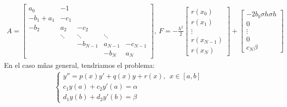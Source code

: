 \begin{align*}
    A = \begin{bmatrix}
            a_0       & -1     &          &         &          \\
            -b_1 +a_1 & -c_1   &          &         &          \\
            -b_2      & a_2    & -c_2     &         &          \\
                      & \ddots & \ddots   & \ddots  &          \\
                      &        & -b_{N-1} & a_{N-1} & -c_{N-1} \\
                      &        &          & -b_N    & a_N
        \end{bmatrix}, \ F = -\frac{h^2}{2} \begin{bmatrix}
                                                r(x_0)     \\
                                                r(x_1)     \\
                                                \vdots     \\
                                                r(x_{N-1}) \\
                                                r(x_N)
                                            \end{bmatrix} + \begin{bmatrix}
                                                                -2b_b\sigma h \sigma h \\
                                                                0                      \\
                                                                \vdots                 \\
                                                                0                      \\
                                                                c_N\beta
                                                            \end{bmatrix}
\end{align*}
En el caso mñas general, tendriamos el problema:
\begin{align*}
    \left\{ \begin{array}{lcc}
                y'' = p(x)y' + q(x)y + r(x), \ \ x \in [a,b] \\
                c_1y(a) + c_2y'(a) = \alpha                  \\
                d_1y(b) + d_2y'(b) = \beta
            \end{array}
    \right.
\end{align*}

